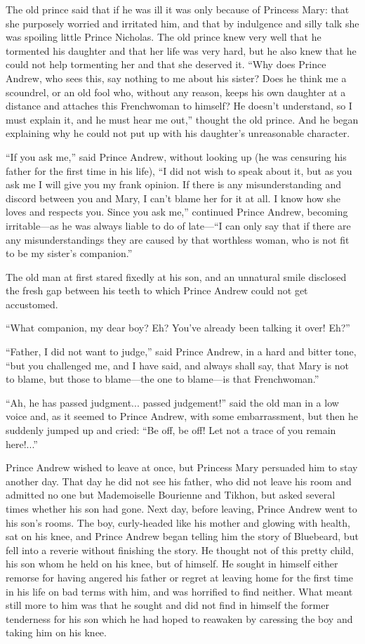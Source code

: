 The old prince said that if he was ill it was only because of
Princess Mary: that she purposely worried and irritated him, and
that by indulgence and silly talk she was spoiling little Prince
Nicholas. The old prince knew very well that he tormented his
daughter and that her life was very hard, but he also knew that
he could not help tormenting her and that she deserved it. ``Why
does Prince Andrew, who sees this, say nothing to me about his
sister? Does he think me a scoundrel, or an old fool who, without
any reason, keeps his own daughter at a distance and attaches
this Frenchwoman to himself? He doesn't understand, so I must
explain it, and he must hear me out,'' thought the old
prince. And he began explaining why he could not put up with his
daughter's unreasonable character.

``If you ask me,'' said Prince Andrew, without looking up (he was
censuring his father for the first time in his life), ``I did not
wish to speak about it, but as you ask me I will give you my
frank opinion. If there is any misunderstanding and discord
between you and Mary, I can't blame her for it at all. I know how
she loves and respects you. Since you ask me,'' continued Prince
Andrew, becoming irritable---as he was always liable to do of
late---``I can only say that if there are any misunderstandings
they are caused by that worthless woman, who is not fit to be my
sister's companion.''

The old man at first stared fixedly at his son, and an unnatural
smile disclosed the fresh gap between his teeth to which Prince
Andrew could not get accustomed.

``What companion, my dear boy? Eh? You've already been talking it
over!  Eh?''

``Father, I did not want to judge,'' said Prince Andrew, in a
hard and bitter tone, ``but you challenged me, and I have said,
and always shall say, that Mary is not to blame, but those to
blame---the one to blame---is that Frenchwoman.''

``Ah, he has passed judgment... passed judgement!'' said the old
man in a low voice and, as it seemed to Prince Andrew, with some
embarrassment, but then he suddenly jumped up and cried: ``Be
off, be off! Let not a trace of you remain here!...''

Prince Andrew wished to leave at once, but Princess Mary
persuaded him to stay another day. That day he did not see his
father, who did not leave his room and admitted no one but
Mademoiselle Bourienne and Tikhon, but asked several times
whether his son had gone. Next day, before leaving, Prince Andrew
went to his son's rooms. The boy, curly-headed like his mother
and glowing with health, sat on his knee, and Prince Andrew began
telling him the story of Bluebeard, but fell into a reverie
without finishing the story. He thought not of this pretty child,
his son whom he held on his knee, but of himself. He sought in
himself either remorse for having angered his father or regret at
leaving home for the first time in his life on bad terms with
him, and was horrified to find neither. What meant still more to
him was that he sought and did not find in himself the former
tenderness for his son which he had hoped to reawaken by
caressing the boy and taking him on his knee.

